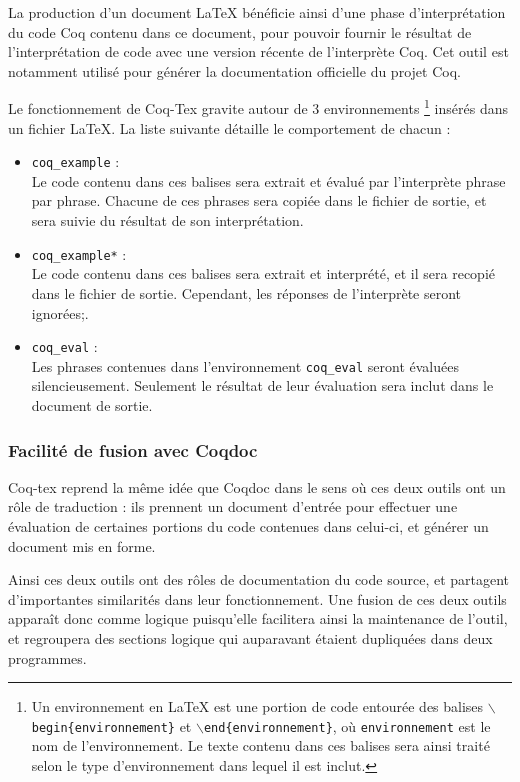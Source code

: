 \documentclass[a4paper, 11pt]{report}
\begin{document}
    La production d'un document LaTeX bénéficie ainsi d'une phase
    d'interprétation du code Coq contenu dans ce document, pour pouvoir fournir
    le résultat de l'interprétation de code avec une version récente de
    l'interprète Coq. Cet outil est notamment utilisé pour générer la documentation
    officielle du projet Coq.

    Le fonctionnement de Coq-Tex gravite autour de 3 environnements \footnote{Un
    environnement en LaTeX est une portion de code entourée des balises
    \texttt{$\backslash$begin\{environnement\}} et
    \texttt{$\backslash$end\{environnement\}}, où \texttt{environnement} est
    le nom de l'environnement. Le texte contenu dans ces balises sera ainsi
    traité selon le type d'environnement dans lequel il est inclut.}
    insérés
    dans un fichier LaTeX. La liste suivante détaille le comportement de
    chacun :
    \begin{itemize}
      \item \texttt{coq\_example} : \\
        Le code contenu dans ces balises sera extrait et évalué par
        l'interprète phrase par phrase. Chacune de ces phrases sera copiée
        dans le fichier de sortie, et sera suivie du résultat de son
        interprétation.
      \item \texttt{coq\_example*} : \\
        Le code contenu dans ces balises sera extrait et interprété, et il
        sera recopié dans le fichier de sortie. Cependant, les réponses de
        l'interprète seront ignorées;.
      \item \texttt{coq\_eval} : \\
        Les phrases contenues dans l'environnement \texttt{coq\_eval} seront
        évaluées silencieusement. Seulement le résultat de leur évaluation sera
        inclut dans le document de sortie.
    \end{itemize}

    \subsubsection{Facilité de fusion avec Coqdoc}
    Coq-tex reprend la même idée que Coqdoc dans le sens où ces deux outils
    ont un rôle de traduction : ils prennent un document d'entrée pour effectuer
    une évaluation de certaines portions du code contenues dans celui-ci, et
    générer un document mis en forme.

    Ainsi ces deux outils ont des rôles de documentation du code source, et
    partagent d'importantes similarités dans leur fonctionnement. Une fusion
    de ces deux outils apparaît donc comme logique puisqu'elle facilitera
    ainsi la maintenance de l'outil, et regroupera des sections logique qui
    auparavant étaient dupliquées dans deux programmes.
\end{document}
